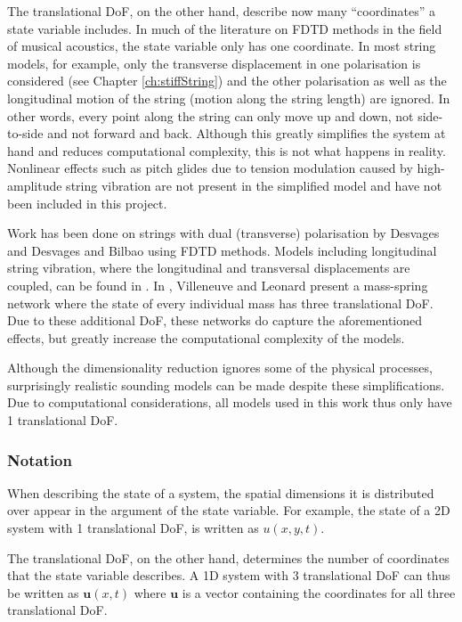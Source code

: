 The translational DoF, on the other hand, describe now many ``coordinates'' a state variable includes. 
In much of the literature on FDTD methods in the field of musical acoustics, the state variable only has one coordinate. In most string models, for example, only the transverse displacement in one polarisation is considered (see Chapter \ref{ch:stiffString}) and the other polarisation as well as the longitudinal motion of the string (motion along the string length) are ignored. In other words, every point along the string can only move up and down, not side-to-side and not forward and back. Although this greatly simplifies the system at hand and reduces computational complexity, this is not what happens in reality. Nonlinear effects such as pitch glides due to tension modulation caused by high-amplitude string vibration are not present in the simplified model and have not been included in this project. 

Work has been done on strings with dual (transverse) polarisation by Desvages \cite{Desvages2018} and Desvages and Bilbao \cite{Desvages2016} using FDTD methods. Models including longitudinal string vibration, where the longitudinal and transversal displacements are coupled, can be found in \cite{theBible,Bilbao2009spring}.
In \cite{Villeneuve2019}, Villeneuve and Leonard present a mass-spring network where the state of every individual mass has three translational DoF. Due to these additional DoF, these networks do capture the aforementioned effects, but greatly increase the computational complexity of the models.

Although the dimensionality reduction ignores some of the physical processes, surprisingly realistic sounding models can be made despite these simplifications. Due to computational considerations, all models used in this work thus only have 1 translational DoF.

\subsubsection{Notation}
When describing the state of a system, the spatial dimensions it is distributed over appear in the argument of the state variable. For example, the state of a 2D system with 1 translational DoF, is written as $u(x,y,t)$.

The translational DoF, on the other hand, determines the number of coordinates that the state variable describes. A 1D system with 3 translational DoF can thus be written as $\mathbf{u}(x,t)$ where $\mathbf{u}$ is a vector containing the coordinates for all three translational DoF.  

